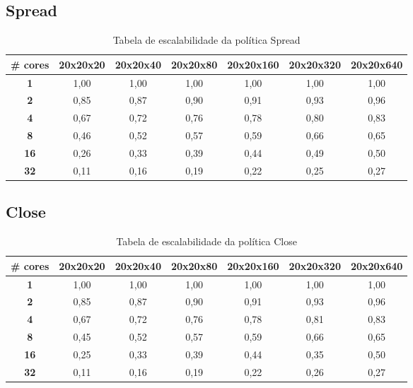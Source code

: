 \documentclass[a4paper, 12pt]{article}
\begin{document}
	\subsection{Spread}
	\begin{table}[htbp]
		\centering
		\begin{tabular}{|c|c|c|c|c|c|c|}
			\hline
			\textbf{\# cores} & \textbf{20x20x20} & \textbf{20x20x40} & \textbf{20x20x80} & \textbf{20x20x160} & \textbf{20x20x320} & \textbf{20x20x640} \\
			\hline
			\textbf{1} & 1,00 & 1,00 & 1,00 & 1,00 & 1,00 & 1,00 \\
			\hline
			\textbf{2} & 0,85 & 0,87 & 0,90 & 0,91 & 0,93 & 0,96 \\
			\hline
			\textbf{4} & 0,67 & 0,72 & 0,76 & 0,78 & 0,80 & 0,83 \\
			\hline
			\textbf{8} & 0,46 & 0,52 & 0,57 & 0,59 & 0,66 & 0,65 \\
			\hline
			\textbf{16} & 0,26 & 0,33 & 0,39 & 0,44 & 0,49 & 0,50 \\
			\hline
			\textbf{32} & 0,11 & 0,16 & 0,19 & 0,22 & 0,25 & 0,27 \\
			\hline
		\end{tabular}
		\caption{Tabela de escalabilidade da política Spread}
	\end{table}
	
	\vspace{5cm}
	
	\FloatBarrier
	
	\subsection{Close}
	\begin{table}[htbp]
		\centering
		\begin{tabular}{|c|c|c|c|c|c|c|}
			\hline
			\textbf{\# cores} & \textbf{20x20x20} & \textbf{20x20x40} & \textbf{20x20x80} & \textbf{20x20x160} & \textbf{20x20x320} & \textbf{20x20x640} \\
			\hline
			\textbf{1} & 1,00 & 1,00 & 1,00 & 1,00 & 1,00 & 1,00 \\
			\hline
			\textbf{2} & 0,85 & 0,87 & 0,90 & 0,91 & 0,93 & 0,96 \\
			\hline
			\textbf{4} & 0,67 & 0,72 & 0,76 & 0,78 & 0,81 & 0,83 \\
			\hline
			\textbf{8} & 0,45 & 0,52 & 0,57 & 0,59 & 0,66 & 0,65 \\
			\hline
			\textbf{16} & 0,25 & 0,33 & 0,39 & 0,44 & 0,35 & 0,50 \\
			\hline
			\textbf{32} & 0,11 & 0,16 & 0,19 & 0,22 & 0,26 & 0,27 \\
			\hline
		\end{tabular}
		\caption{Tabela de escalabilidade da política Close}
	\end{table}
	
\end{document}
